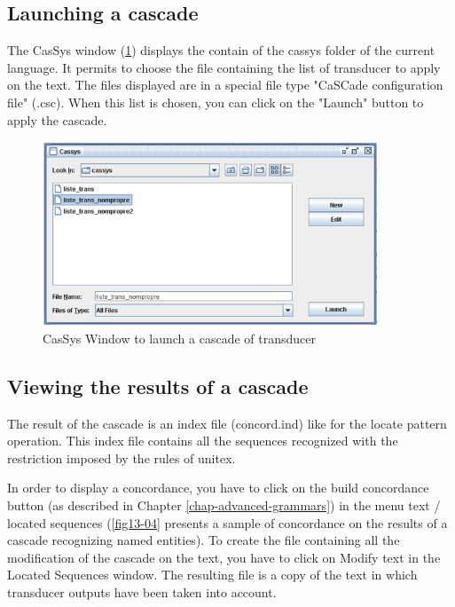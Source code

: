 \subsection{Launching a cascade}
\label{subsec:launchCascade}

The CasSys window (\ref{fig13-02}) displays the contain of the cassys folder of the current language. It permits to choose 
the file containing the list of transducer to apply on the text. The files displayed are in a special file type "CaSCade configuration file" (.csc). 
When this list is chosen, you can click on the "Launch" button to apply the cascade.

\begin{figure}[!htb]
  \centering
  \includegraphics[width=10cm]{resources/img/fig13-02.png}
  \caption{CasSys Window to launch a cascade of transducer}
  \label{fig13-02}
\end{figure}

\subsection{Viewing the results of a cascade}
\label{subsec:resultsCascade}

The result of the cascade is an index file (concord.ind) like for the locate pattern operation. This index file contains all the sequences recognized with the restriction imposed by the rules of unitex.

\bigskip
\noindent In order to display a concordance, you have to click on the build concordance button (as described in Chapter \ref{chap-advanced-grammars}) 
in the menu text / located sequences (\ref{fig13-04} presents a sample of concordance on the results of a cascade recognizing named entities).
To create the file containing all the modification of the cascade on the text, you have to click on Modify text in the Located Sequences window.
 The resulting file is a copy of the text in which transducer outputs have been taken into account.

